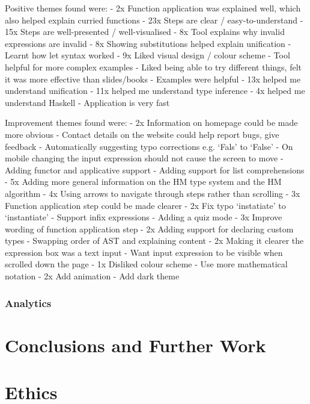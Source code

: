 \documentclass[a4paper,fleqn,12pt]{article}
\begin{document}
Positive themes found were:
- 2x Function application was explained well, which also helped explain curried functions
- 23x Steps are clear / easy-to-understand
- 15x Steps are well-presented / well-visualised
- 8x Tool explains why invalid expressions are invalid
- 8x Showing substitutions helped explain unification
- Learnt how let syntax worked
- 9x Liked visual design / colour scheme
- Tool helpful for more complex examples
- Liked being able to try different things, felt it was more effective than slides/books
- Examples were helpful
- 13x helped me understand unification
- 11x helped me understand type inference
- 4x helped me understand Haskell
- Application is very fast

Improvement themes found were:
- 2x Information on homepage could be made more obvious
- Contact details on the website could help report bugs, give feedback
- Automatically suggesting typo corrections e.g. ‘Fals’ to ‘False’
- On mobile changing the input expression should not cause the screen to move
- Adding functor and applicative support
- Adding support for list comprehensions
- 5x Adding more general information on the HM type system and the HM algorithm
- 4x Using arrows to navigate through steps rather than scrolling
- 3x Function application step could be made clearer
- 2x Fix typo ‘instatiate’ to ‘instantiate’
- Support infix expressions
- Adding a quiz mode
- 3x Improve wording of function application step
- 2x Adding support for declaring custom types
- Swapping order of AST and explaining content
- 2x Making it clearer the expression box was a text input
- Want input expression to be visible when scrolled down the page
- 1x Disliked colour scheme
- Use more mathematical notation
- 2x Add animation
- Add dark theme
\subsubsection{Analytics}\label{id:h.67g05flyfv0z}

\section{Conclusions and Further Work}\label{id:h.fc67ipatea73}

\section{Ethics}\label{id:h.i0n8c6hqdr6j}
\end{document}
